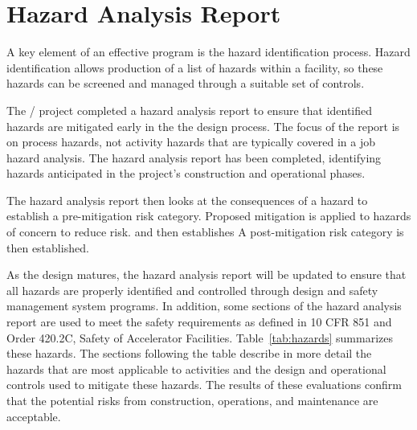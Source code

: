 \section{Hazard Analysis Report}

A key element of an effective  program is the hazard
identification process. Hazard identification allows production of a
list of hazards within a facility, so these hazards can be screened
and managed through a suitable set of controls.

The / project completed a hazard analysis
report to ensure that identified hazards are mitigated early in the
the design process.  The focus of the report is on process hazards,
not activity hazards that are typically covered in a job hazard
analysis.  The hazard analysis report has been completed, identifying
hazards anticipated in the project's construction and operational
phases.

The hazard analysis report then looks at the consequences of a hazard
to establish a pre-mitigation risk category. Proposed mitigation is
applied to hazards of concern to reduce risk. and then establishes A
post-mitigation risk category is then established.

As the  design matures, the hazard analysis report will be updated to ensure
that all hazards are properly identified and controlled through
design and safety management system programs.  In addition, some
sections of the hazard analysis report are used to meet the safety requirements as
defined in 10 CFR 851 and  Order 420.2C, Safety of
Accelerator Facilities.  Table~\ref{tab:hazards} summarizes these
hazards.  The sections following the table describe in more detail the hazards that
are most applicable to  activities and the
design and operational controls used to mitigate these hazards. The
results of these evaluations confirm that the potential risks from
construction, operations, and maintenance are acceptable.


